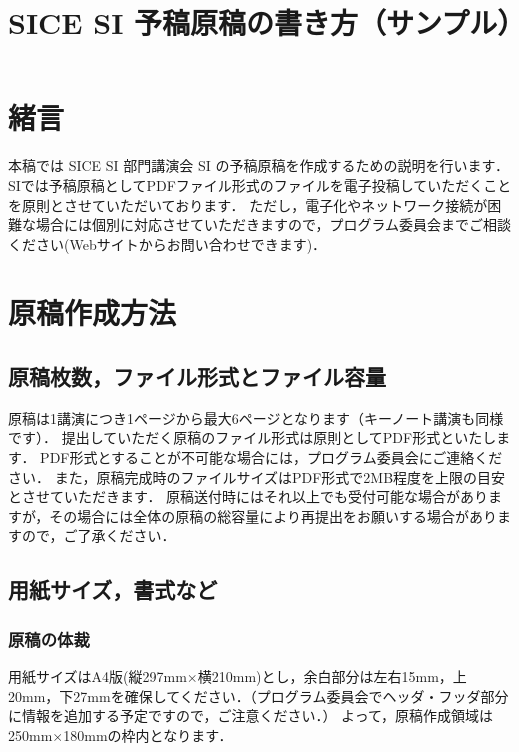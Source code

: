 \documentclass[a4paper]{jarticle}
\begin{document}
%
\title{SICE SI 予稿原稿の書き方（サンプル）} %
%
\maketitle
%
\section{緒言}
本稿では SICE SI 部門講演会 SI の予稿原稿を作成するための説明を行います．
SIでは予稿原稿としてPDFファイル形式のファイルを電子投稿していただくことを原則とさせていただいております．
ただし，電子化やネットワーク接続が困難な場合には個別に対応させていただきますので，プログラム委員会までご相談ください(Webサイトからお問い合わせできます)．
%
\section{原稿作成方法}
\subsection{原稿枚数，ファイル形式とファイル容量}
原稿は1講演につき1ページから最大6ページとなります（キーノート講演も同様です）．
提出していただく原稿のファイル形式は原則としてPDF形式といたします．
PDF形式とすることが不可能な場合には，プログラム委員会にご連絡ください．
また，原稿完成時のファイルサイズはPDF形式で2MB程度を上限の目安とさせていただきます．
原稿送付時にはそれ以上でも受付可能な場合がありますが，その場合には全体の原稿の総容量により再提出をお願いする場合がありますので，ご了承ください．
%
\subsection{用紙サイズ，書式など}
\subsubsection{原稿の体裁}
用紙サイズはA4版(縦297mm$\times$横210mm)とし，余白部分は左右15mm，上20mm，下27mmを確保してください．（プログラム委員会でヘッダ・フッダ部分に情報を追加する予定ですので，ご注意ください．）
よって，原稿作成領域は250mm$\times$180mmの枠内となります．
%
\end{document}
